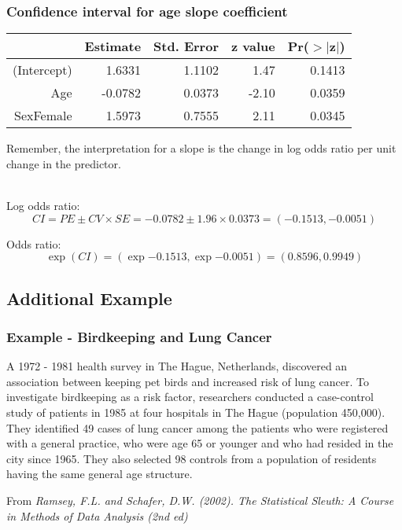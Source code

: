 

\begin{frame}
\frametitle{Confidence interval for age slope coefficient}

\begin{center}
\begin{tabular}{rrrrr}
  \hline
 & Estimate & Std. Error & z value & Pr($>$$|$z$|$) \\ 
  \hline
(Intercept) & 1.6331 & 1.1102 & 1.47 & 0.1413 \\ 
  Age & -0.0782 & 0.0373 & -2.10 & 0.0359 \\ 
  SexFemale & 1.5973 & 0.7555 & 2.11 & 0.0345 \\ 
   \hline
\end{tabular}
\end{center}

Remember, the interpretation for a slope is the change in log odds ratio per unit change in the predictor.\\
~\\

\pause

Log odds ratio:
\[ CI = PE \pm CV \times SE = -0.0782 \pm 1.96 \times 0.0373 = (-0.1513,  -0.0051) \]

\pause

Odds ratio:
\[ \exp(CI) = (\exp{-0.1513}, \exp{-0.0051}) = (0.8596, 0.9949) \]


\end{frame}



\subsection{Additional Example}



\begin{frame}
\frametitle{Example - Birdkeeping and Lung Cancer}

A 1972 - 1981 health survey in The Hague, Netherlands, discovered an association between keeping pet birds and increased risk of lung cancer. To investigate birdkeeping as a risk factor, researchers conducted a case-control study of patients in 1985 at four hospitals in The Hague (population 450,000). They identified 49 cases of lung cancer among the patients who were registered with a general practice, who were age 65 or younger and who had resided in the city since 1965. They also selected 98 controls from a population of residents having the same general age structure.


\vfill

{\tiny From \textit{Ramsey, F.L. and Schafer, D.W. (2002). The Statistical Sleuth: A Course in Methods of Data Analysis (2nd ed)}}
\end{frame}

